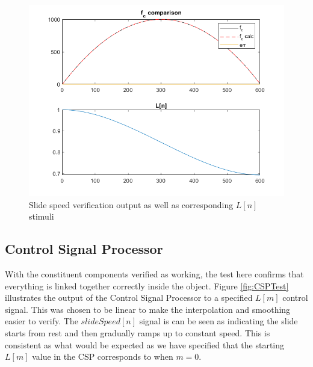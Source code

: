 \documentclass[../main.tex]{subfiles}
\begin{document}
\begin{figure}[h]
    \centering
    \includegraphics[scale=.65]{./images/plots/SlideSpeedExtractorTest.png}
    \caption{Slide speed verification output as well as corresponding $L[n]$ stimuli}
    \label{fig:SlideSpeedTest}
\end{figure}

\subsection{Control Signal Processor}
With the constituent components verified as working, the test here confirms that everything is linked together correctly inside the object. Figure \ref{fig:CSPTest} illustrates the output of the Control Signal Processor to a specified $L[m]$ control signal. This was chosen to be linear to make the interpolation and smoothing easier to verify. The $slideSpeed[n]$ signal is can be seen as indicating the slide starts from rest and then gradually ramps up to constant speed. This is consistent as what would be expected as we have specified that the starting $L[m]$ value in the CSP corresponds to when $m = 0$.
\end{document}
